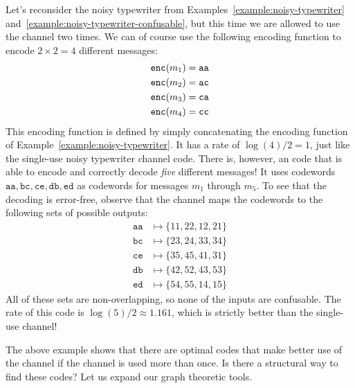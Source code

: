 \begin{example}\label{example:typewriter-multiple-uses}
Let's reconsider the noisy typewriter from Examples~\ref{example:noisy-typewriter} and~\ref{example:noisy-typewriter-confusable}, but this time we are allowed to use the channel two times. We can of course use the following encoding function to encode $2 \times 2 = 4$ different messages:
\begin{align*}
\mathtt{enc}(m_1) &= \mathtt{aa}\\
\mathtt{enc}(m_2) &= \mathtt{ac}\\
\mathtt{enc}(m_3) &= \mathtt{ca}\\
\mathtt{enc}(m_4) &= \mathtt{cc}\\
\end{align*}
This encoding function is defined by simply concatenating the encoding function of Example~\ref{example:noisy-typewriter}. It has a rate of $\log(4) / 2 = 1$, just like the single-use noisy typewriter channel code. There is, however, an code that is able to encode and correctly decode \emph{five} different messages! It uses codewords $\mathtt{aa}, \mathtt{bc}, \mathtt{ce}, \mathtt{db}, \mathtt{ed}$ as codewords for messages $m_1$ through $m_5$. To see that the decoding is error-free, observe that the channel maps the codewords to the following sets of possible outputs:
\begin{align*}
\mathtt{aa} &\mapsto \{11, 22, 12, 21\}\\ 
\mathtt{bc} &\mapsto \{23, 24, 33, 34\}\\
\mathtt{ce} &\mapsto \{35, 45, 41, 31\}\\
\mathtt{db} &\mapsto \{42, 52, 43, 53\}\\
\mathtt{ed} &\mapsto \{54, 55, 14, 15\} 
\end{align*}
All of these sets are non-overlapping, so none of the inputs are confusable. The rate of this code is $\log(5) / 2 \approx 1.161$, which is strictly better than the single-use channel!
\end{example}

The above example shows that there are optimal codes that make better use of the channel if the channel is used more than once. Is there a structural way to find these codes? Let us expand our graph theoretic tools.

